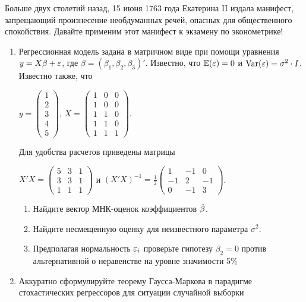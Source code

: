 \documentclass[12pt, a4paper]{article}
\begin{document}
Больше двух столетий назад, 15 июня 1763 года Екатерина II издала манифест, запрещающий произнесение необдуманных речей, опасных для общественного спокойствия. Давайте применим этот манифест к экзамену по эконометрике!



\begin{enumerate}
\item Регрессионная модель  задана в матричном виде при помощи уравнения $y=X\beta+\varepsilon$, где $\beta=(\beta_1,\beta_2,\beta_3)'$.
Известно, что $\mathbb{E}(\varepsilon)=0$  и  $\operatorname{Var}(\varepsilon)=\sigma^2\cdot I$.
Известно также, что

$y=\left(
\begin{array}{c}
1\\
2\\
3\\
4\\
5
\end{array}\right)$,
$X=\left(\begin{array}{ccc}
1 & 0 & 0 \\
1 & 0 & 0 \\
1 & 1 & 0 \\
1 & 1 & 0 \\
1 & 1 & 1
\end{array}\right)$.


Для удобства расчетов приведены матрицы


$X'X=\left(
\begin{array}{ccc}
5 & 3 & 1\\
3 & 3 & 1\\
1 & 1 & 1
\end{array}\right)$ и $(X'X)^{-1}=\frac{1}{2}\left(
\begin{array}{ccc}
1 & -1 & 0 \\
-1 & 2 & -1 \\
0 & -1 & 3
\end{array}\right)$.

\begin{enumerate}
\item Найдите вектор МНК-оценок коэффициентов $\hat{\beta}$.
\item Найдите несмещенную оценку для неизвестного параметра $\sigma^2$.
\item Предполагая нормальность $\varepsilon_i$ проверьте гипотезу $\beta_2=0$ против альтернативной о неравенстве на уровне значимости 5\%

\end{enumerate}

\item Аккуратно сформулируйте теорему Гаусса-Маркова в парадигме стохастических регрессоров для ситуации случайной выборки


\end{enumerate}
\end{document}
